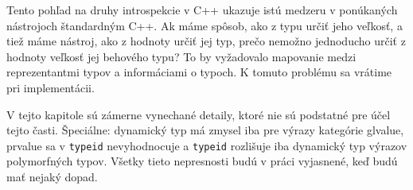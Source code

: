 Tento pohľad na druhy introspekcie v C++ ukazuje istú medzeru v ponúkaných nástrojoch štandardným C++. Ak máme spôsob, ako z typu určiť jeho veľkosť, a tiež máme nástroj, ako z hodnoty určiť jej  typ, prečo nemožno jednoducho určiť z hodnoty veľkosť jej behového typu? To by vyžadovalo mapovanie medzi reprezentantmi typov a informáciami o typoch. K tomuto problému sa vrátime pri implementácii.

V tejto kapitole sú zámerne vynechané detaily, ktoré nie sú podstatné pre účel tejto časti. Špeciálne: dynamický typ má zmysel iba pre výrazy kategórie glvalue, prvalue sa v \texttt{typeid} nevyhodnocuje a  \texttt{typeid} rozlišuje iba dynamický typ výrazov polymorfných typov. Všetky tieto nepresnosti budú v práci vyjasnené, keď budú mať nejaký dopad.
